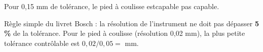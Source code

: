 \documentclass[11pt,a4paper]{article}
\begin{document}
Pour 0,15 mm de tolérance, le pied à coulisse est\quad \cb capable \quad \cb pas capable.\par\smallskip
Règle simple du livret Bosch : la résolution de l'instrument ne doit pas dépasser \textbf{5 \%} de la tolérance. Pour le pied à coulisse (résolution 0,02 mm), la plus petite tolérance contrôlable est $0{,}02 / 0{,}05 =$ \champ{14mm} mm.
\par\vspace{2pt}
\end{document}
